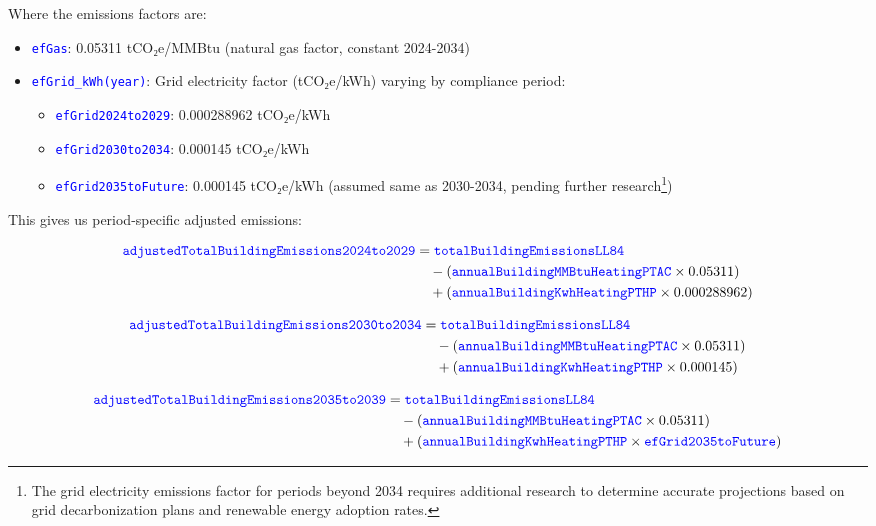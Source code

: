 \documentclass{article}
\newcommand{\code}[1]{\textcolor{blue}{\texttt{#1}}}
\begin{document}
Where the emissions factors are:
\begin{itemize}
    \item \code{efGas}: 0.05311 tCO₂e/MMBtu (natural gas factor, constant 2024-2034)
    \item \code{efGrid\_kWh(year)}: Grid electricity factor (tCO₂e/kWh) varying by compliance period:
    \begin{itemize}
        \item \code{efGrid2024to2029}: 0.000288962 tCO₂e/kWh
        \item \code{efGrid2030to2034}: 0.000145 tCO₂e/kWh
        \item \code{efGrid2035toFuture}: 0.000145 tCO₂e/kWh (assumed same as 2030-2034, pending further research\footnote{The grid electricity emissions factor for periods beyond 2034 requires additional research to determine accurate projections based on grid decarbonization plans and renewable energy adoption rates.})
    \end{itemize}
\end{itemize}

This gives us period-specific adjusted emissions:

\begin{align}
\code{adjustedTotalBuildingEmissions2024to2029} &= \code{totalBuildingEmissionsLL84} \nonumber \\
&\quad - (\code{annualBuildingMMBtuHeatingPTAC} \times 0.05311) \nonumber \\
&\quad + (\code{annualBuildingKwhHeatingPTHP} \times 0.000288962)
\end{align}

\begin{align}
\code{adjustedTotalBuildingEmissions2030to2034} &= \code{totalBuildingEmissionsLL84} \nonumber \\
&\quad - (\code{annualBuildingMMBtuHeatingPTAC} \times 0.05311) \nonumber \\
&\quad + (\code{annualBuildingKwhHeatingPTHP} \times 0.000145)
\end{align}

\begin{align}
\code{adjustedTotalBuildingEmissions2035to2039} &= \code{totalBuildingEmissionsLL84} \nonumber \\
&\quad - (\code{annualBuildingMMBtuHeatingPTAC} \times 0.05311) \nonumber \\
&\quad + (\code{annualBuildingKwhHeatingPTHP} \times \code{efGrid2035toFuture})
\end{align}
\end{document}
